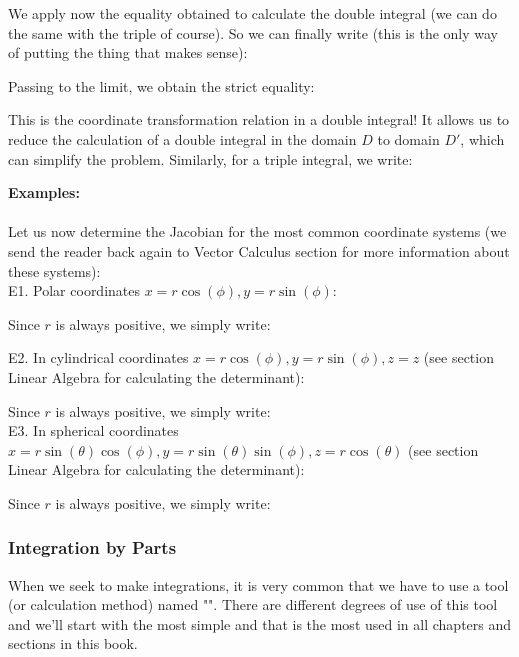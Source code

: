 	We apply now the equality obtained to calculate the double integral (we can do the same with the triple of course). So we can finally write (this is the only way of putting the thing that makes sense):
	
	Passing to the limit, we obtain the strict equality:
	
	This is the coordinate transformation relation in a double integral! It allows us to reduce the calculation of a double integral in the domain $D$ to domain $D'$, which can simplify the problem.
	Similarly, for a triple integral, we write:
	
	
	\begin{tcolorbox}[colframe=black,colback=white,sharp corners]
	\textbf{{\Large {}}Examples:}\\\\
	Let us now determine the Jacobian for the most common coordinate systems (we send the reader back again to Vector Calculus section for more information about these systems):\\
	
	E1. Polar coordinates $x=r\cos(\phi),y=r\sin(\phi)$:
	
	Since $r$ is always positive, we simply write:
	
	\end{tcolorbox}
	\pagebreak
	
	\begin{tcolorbox}[colframe=black,colback=white,sharp corners]
	E2. In cylindrical coordinates $x=r\cos(\phi),y=r\sin(\phi),z=z$ (see section Linear Algebra for calculating the determinant):
	
	Since $r$ is always positive, we simply write:
	\\
	
	E3. In spherical coordinates $x=r\sin(\theta)\cos(\phi),y=r\sin(\theta)\sin(\phi),z=r\cos(\theta)$ (see section Linear Algebra for calculating the determinant):
	
	Since $r$ is always positive, we simply write:
	
	\end{tcolorbox}

	\subsubsection{Integration by Parts}
	When we seek to make integrations, it is very common that we have to use a tool (or calculation method) named "". There are different degrees of use of this tool and we'll start with the most simple and that is the most used in all chapters and sections in this book.
	
